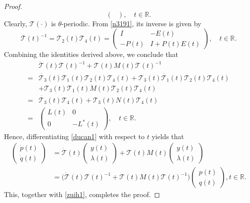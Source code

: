 \documentclass{IEEEtran}
\begin{document}
\begin{proof}
\begin{equation}
\begin{pmatrix}
			\end{pmatrix},\quad t\in\mathbb R.
		\end{equation}
		Clearly, $\mathcal{T}(\cdot)$ is $\theta$-periodic. From \eqref{n3191}, its inverse is given by
		\begin{equation*}
			\mathcal T(t)^{-1}=\mathcal T_2(t) \mathcal T_4(t)=
			\begin{pmatrix}
				I&-E(t)\\-P(t)&I+P(t)E(t)
			\end{pmatrix},\quad t\in\mathbb R.
		\end{equation*}
		Combining the identities derived above, we conclude that
		\begin{equation}\label{zuih1}
			\begin{split}
				&\dot{\mathcal T}(t) \mathcal T(t)^{-1}+\mathcal T(t) M(t) \mathcal T(t)^{-1}\\
				=&\dot{\mathcal T_3}(t) \mathcal T_1(t) \mathcal T_2(t) \mathcal T_4(t)
				+\mathcal T_3(t) \dot{\mathcal T_1}(t) \mathcal T_2(t) \mathcal T_4(t)\\
				&+\mathcal T_3(t) \mathcal T_1(t) M(t) \mathcal T_2(t) \mathcal T_4(t)\\
				=& \dot{\mathcal T_3}(t) \mathcal T_4(t)+\mathcal T_3(t) N(t) \mathcal T_4(t)\\
				=&
				\begin{pmatrix}
					L(t)& 0\\
					0&-L^*(t)
				\end{pmatrix},\quad t\in \mathbb{R}.
			\end{split}
		\end{equation}
		Hence, differentiating \eqref{ducan1} with respect to $t$ yields that
		\begin{equation*}
			\begin{split}
				\begin{pmatrix}
					\dot{p}(t)\\ \dot{q} (t)
				\end{pmatrix}
				&=\dot{\mathcal T}(t)\begin{pmatrix}
					y(t)\\ \lambda (t)
				\end{pmatrix}
				+\mathcal T(t) M(t)\begin{pmatrix}
					y(t)\\ \lambda (t)
				\end{pmatrix}\\
				&=\Big(\dot{\mathcal T}(t) \mathcal T(t)^{-1}+\mathcal T(t) M(t) \mathcal T(t)^{-1}\Big)
				\begin{pmatrix}
					p(t)\\ q (t)
				\end{pmatrix}, t\in\mathbb{R}.
			\end{split}
		\end{equation*}
		This, together with \eqref{zuih1}, completes the proof.
	\end{proof}
\end{document}
